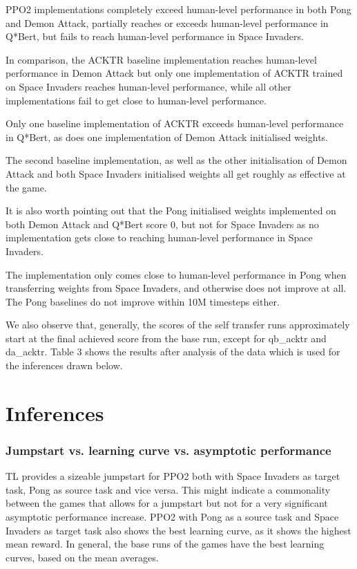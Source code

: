 PPO2 implementations completely exceed human-level performance in both Pong and Demon Attack, partially reaches or exceeds human-level performance in Q*Bert, but fails to reach human-level performance in Space Invaders.
 
In comparison, the ACKTR baseline implementation reaches human-level performance in Demon Attack but only one implementation of ACKTR trained on Space Invaders reaches human-level performance, while all other implementations fail to get close to human-level performance. 

Only one baseline implementation of ACKTR exceeds human-level performance in Q*Bert, as does one implementation of Demon Attack initialised weights. 

The second baseline implementation, as well as the other initialisation of Demon Attack and both Space Invaders initialised weights all get roughly as effective at the game. 

It is also worth pointing out that the Pong initialised weights implemented on both Demon Attack and Q*Bert score 0, but not for Space Invaders as no implementation gets close to reaching human-level performance in Space Invaders.

The implementation only comes close to human-level performance in Pong when transferring weights from Space Invaders, and otherwise does not improve at all. The Pong baselines do not improve within 10M timesteps either.

We also observe that, generally, the scores of the self transfer runs approximately start at the final achieved score from the base run, except for qb\_acktr and da\_acktr.
Table 3 shows the results after analysis of the data which is used for the inferences drawn below.

\section{Inferences}
\subsubsection*{Jumpstart vs. learning curve vs. asymptotic performance}
TL provides a sizeable jumpstart for PPO2 both with Space Invaders as target task, Pong as source task and vice versa. This might indicate a commonality between the games that allows for a jumpstart but not for a very significant asymptotic performance increase. PPO2 with Pong as a source task and Space Invaders as target task also shows the best learning curve, as it shows the highest mean reward. In general, the base runs of the games have the best learning curves, based on the mean averages. 

